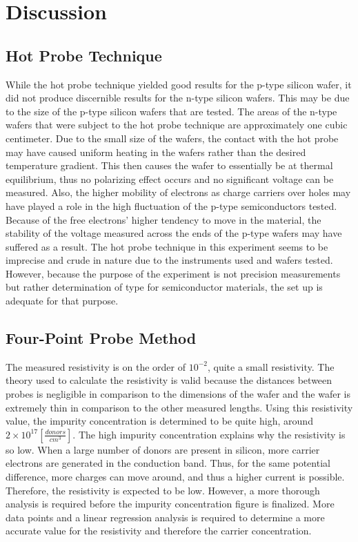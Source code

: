 \documentclass{article}
\begin{document}
	
	\section{Discussion}
	\subsection{Hot Probe Technique}
	While the hot probe technique yielded good results for the p-type silicon wafer, it did not produce discernible results for the n-type silicon wafers. This may be due to the size of the p-type silicon wafers that are tested. The areas of the n-type wafers that were subject to the hot probe technique are approximately one cubic centimeter. Due to the small size of the wafers, the contact with the hot probe may have caused uniform heating in the wafers rather than the desired temperature gradient. This then causes the wafer to essentially be at thermal equilibrium, thus no polarizing effect occurs and no significant voltage can be measured. Also, the higher mobility of electrons as charge carriers over holes may have played a role in the high fluctuation of the p-type semiconductors tested. Because of the free electrons' higher tendency to move in the material, the stability of the voltage measured across the ends of the p-type wafers may have suffered as a result. The hot probe technique in this experiment seems to be imprecise and crude in nature due to the instruments used and wafers tested. However, because the purpose of the experiment is not precision measurements but rather determination of type for semiconductor materials, the set up is adequate for that purpose.

	\subsection{Four-Point Probe Method}
The measured resistivity is on the order of $10^{-2}$, quite a small resistivity. The theory used to calculate the resistivity is valid because the distances between probes is negligible in comparison to the dimensions of the wafer and the wafer is extremely thin in comparison to the other measured lengths. Using this resistivity value, the impurity concentration is determined to be quite high, around $2 \times 10^{17} [\frac{donors}{cm^3}]$. The high impurity concentration explains why the resistivity is so low. When a large number of donors are present in silicon, more carrier electrons are generated in the conduction band. Thus, for the same potential difference, more charges can move around, and thus a higher current is possible. Therefore, the resistivity is expected to be low. However, a more thorough analysis is required before the impurity concentration figure is finalized. More data points and a linear regression analysis is required to determine a more accurate value for the resistivity and therefore the carrier concentration.
\end{document}
